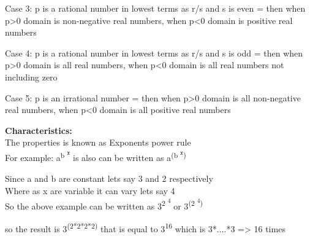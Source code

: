 \documentclass[a4paper,10pt]{article}
\begin{document}
\indent\indent
{\fontsize{12}{16}\selectfont Case 3: p is a rational number in lowest terms as r/s and s is even = then when p>0 domain is non-negative real numbers, when p<0 domain is positive real numbers  \\}


\indent\indent
{\fontsize{12}{16}\selectfont Case 4: p is a rational number in lowest terms as r/s and s is odd = then when p>0 domain is all real numbers, when p<0 domain is all real numbers not including zero  \\}


\indent\indent
{\fontsize{12}{16}\selectfont Case 5: p is an  irrational number = then when p>0 domain is all non-negative real numbers, when p<0 domain is all positive real numbers  \\}

{\Large\textbf{Characteristics:}\\}
\newline
\indent\indent
{\fontsize{12}{16}\selectfont The properties is known as Exponents power rule \\}
\newline
\indent\indent
{\fontsize{12}{16}\selectfont For example: a\textsuperscript{b \textsuperscript{x}} is also can be written as a\textsuperscript{(b \textsuperscript{x})}}

\indent\indent\indent
{\fontsize{12}{16}\selectfont Since a and b are constant lets say 3 and 2 respectively \\}
\indent\indent\indent
{\fontsize{12}{16}\selectfont Where as x are variable it can vary lets say 4  \\}
\newline
\indent\indent\indent
{\fontsize{12}{16}\selectfont So the above example can be written as 3\textsuperscript{2 \textsuperscript{4}} or 3\textsuperscript{(2 \textsuperscript{4})} \\ }

\indent\indent\indent
{\fontsize{12}{16}\selectfont so the result is 3\textsuperscript{(2*2*2*2)} that is equal to 3\textsuperscript{16} which is 3*....*3 => 16 times }
\pagebreak
\end{document}
